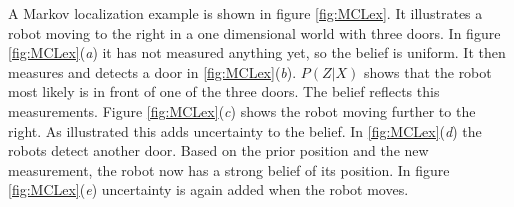 A Markov localization example is shown in figure \ref{fig:MCLex}. It illustrates a robot moving to the right in a one dimensional world with three doors. In figure \ref{fig:MCLex}(\emph{a}) it has not measured anything yet, so the belief is uniform. It then measures and detects a door in \ref{fig:MCLex}(\emph{b}). $P(Z|X)$ shows that the robot most likely is in front of one of the three doors. The belief reflects this measurements. 
Figure \ref{fig:MCLex}(\emph{c}) shows the robot moving further to the right. As illustrated this adds uncertainty to the belief. In \ref{fig:MCLex}(\emph{d}) the robots detect another door. Based on the prior position and the new measurement, the robot now has a strong belief of its position.
In figure \ref{fig:MCLex}(\emph{e}) uncertainty is again added when the robot moves.

